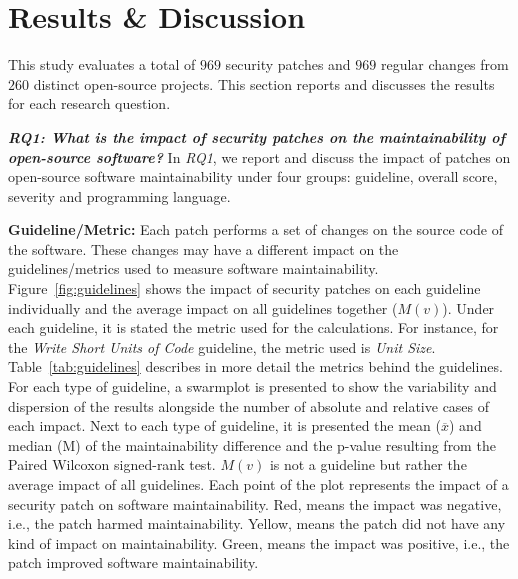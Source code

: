 \documentclass[smallextended]{svjour3}       %
\begin{document}
\section{Results \& Discussion}\label{sec:results}

This study evaluates a total of $969$ security patches and 
$969$ regular changes 
from $260$ distinct open-source projects. 
This section 
reports and discusses the results for each research question.
%

\textit{\textbf{RQ1: What is the impact of security patches on the
maintainability of open-source software?}} In \emph{RQ1}, we 
report and discuss the impact of patches on open-source software 
maintainability under four groups: guideline, overall score, 
severity and programming language.

\textbf{Guideline/Metric:} Each patch performs a set of changes
on the source code of the software. These changes may have a 
different impact on the guidelines/metrics used to measure software 
maintainability. Figure~\ref{fig:guidelines} shows the impact of 
security patches on each guideline individually and the average 
impact on all guidelines together ($M(v)$). Under each guideline, it 
is stated the metric used for the calculations. For instance, for the 
\emph{Write Short Units of Code} guideline, the metric used is 
\emph{Unit Size}. Table~\ref{tab:guidelines} describes in more 
detail the metrics behind the guidelines. For each type of 
guideline, a swarmplot is presented to show the variability and 
dispersion of the results alongside the number of absolute and 
relative cases of each impact. Next to each type of guideline, it is 
presented the mean ($\overline{x}$) and median (M) of the 
maintainability difference and the p-value resulting from the Paired 
Wilcoxon signed-rank test. $M(v)$ is not a guideline but rather the 
average impact of all guidelines. Each point of the plot represents 
the impact of a security patch on software maintainability. Red, 
means the impact was negative, i.e., the patch harmed 
maintainability. Yellow, means the patch did not have any kind of 
impact on maintainability. Green, means the impact was positive, i.e., 
the patch improved software maintainability.
\end{document}
